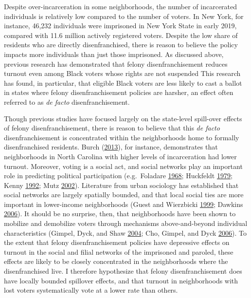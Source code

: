 \documentclass[12pt,]{article}
\begin{document}
Despite over-incarceration in some neighborhoods, the number of incarcerated individuals is relatively low compared to the number of voters. In New York, for instance, 46,232 individuals were imprisoned in New York State in early 2019, compared with 11.6 million actively registered voters. Despite the low share of residents who are directly disenfranchised, there is reason to believe the policy impacts more individuals than just those imprisoned. As discussed above, previous research has demonstrated that felony disenfranchisement reduces turnout even among Black voters whose rights are not suspended This research has found, in particular, that eligible Black voters are less likely to cast a ballot in states where felony disenfranchisement policies are harsher, an effect often referred to as \emph{de facto} disenfranchisement.

Though previous studies have focused largely on the state-level spill-over effects of felony disenfranchisement, there is reason to believe that this \emph{de facto} disenfranchisement is concentrated within the neighborhoods home to formally disenfranchised residents. Burch (\protect\hyperlink{ref-Burch2013}{2013}), for instance, demonstrates that neighborhoods in North Carolina with higher levels of incarceration had lower turnout. Moreover, voting is a social act, and social networks play an important role in predicting political participation (e.g.~Foladare \protect\hyperlink{ref-Foladare1968}{1968}; Huckfeldt \protect\hyperlink{ref-Huckfeldt1979}{1979}; Kenny \protect\hyperlink{ref-Kenny1992}{1992}; Mutz \protect\hyperlink{ref-Mutz2002}{2002}). Literature from urban sociology has established that social networks are largely spatially bounded, and that local social ties are more important in lower-income neighborhoods (Guest and Wierzbicki \protect\hyperlink{ref-Guest1999}{1999}; Dawkins \protect\hyperlink{ref-Dawkins2006}{2006}). It should be no surprise, then, that neighborhoods have been shown to mobilize and demobilize voters through mechanisms above-and-beyond individual characteristics (Gimpel, Dyck, and Shaw \protect\hyperlink{ref-Gimpel2004}{2004}; Cho, Gimpel, and Dyck \protect\hyperlink{ref-Cho2006}{2006}). To the extent that felony disenfranchisement policies have depressive effects on turnout in the social and filial networks of the imprisoned and paroled, these effects are likely to be closely concentrated in the neighborhoods where the disenfranchised live. I therefore hypothesize that felony disenfranchisement does have locally bounded spillover effects, and that turnout in neighborhoods with lost voters systematically vote at a lower rate than others.
\end{document}

